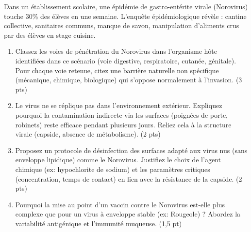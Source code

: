 \documentclass[11pt]{article}
\begin{document}
\begin{exercice}
Dans un établissement scolaire, une épidémie de gastro-entérite virale (Norovirus) touche 30\% des élèves en une semaine. L'enquête épidémiologique révèle : cantine collective, sanitaires communs, manque de savon, manipulation d'aliments crus par des élèves en stage cuisine.
\begin{enumerate}
    \item Classez les voies de pénétration du Norovirus dans l'organisme hôte identifiées dans ce scénario (voie digestive, respiratoire, cutanée, génitale). Pour chaque voie retenue, citez une barrière naturelle non spécifique (mécanique, chimique, biologique) qui s'oppose normalement à l'invasion. (3 pts)
    \item Le virus ne se réplique pas dans l'environnement extérieur. Expliquez pourquoi la contamination indirecte via les surfaces (poignées de porte, robinets) reste efficace pendant plusieurs jours. Reliez cela à la structure virale (capside, absence de métabolisme). (2 pts)
    \item Proposez un protocole de désinfection des surfaces adapté aux virus nus (sans enveloppe lipidique) comme le Norovirus. Justifiez le choix de l'agent chimique (ex: hypochlorite de sodium) et les paramètres critiques (concentration, temps de contact) en lien avec la résistance de la capside. (2 pts)
    \item Pourquoi la mise au point d'un vaccin contre le Norovirus est-elle plus complexe que pour un virus à enveloppe stable (ex: Rougeole) ? Abordez la variabilité antigénique et l'immunité muqueuse. (1,5 pt)
\end{enumerate}
\end{exercice}
\end{document}
